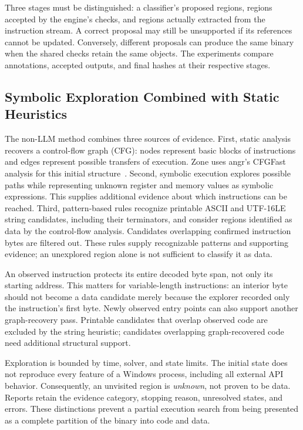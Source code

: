 Three stages must be distinguished: a classifier's proposed regions,
regions accepted by the engine's checks, and regions actually extracted
from the instruction stream. A correct proposal may still be unsupported
if its references cannot be updated. Conversely, different proposals can
produce the same binary when the shared checks retain the same objects.
The experiments compare annotations, accepted outputs, and final hashes
at their respective stages.

\subsection{Symbolic Exploration Combined with Static Heuristics}
The non-LLM method combines three sources of evidence. First, static
analysis recovers a control-flow graph (CFG): nodes represent basic blocks
of instructions and edges represent possible transfers of execution.
Zone uses angr's CFGFast analysis for this initial structure~\cite{angr_cfg_docs}.
Second, symbolic execution explores possible paths while representing
unknown register and memory values as symbolic expressions. This supplies
additional evidence about which instructions can be reached. Third,
pattern-based rules recognize printable ASCII and UTF-16LE string
candidates, including their terminators, and consider regions identified
as data by the control-flow analysis. Candidates overlapping confirmed
instruction bytes are filtered out. These rules supply recognizable
patterns and supporting evidence; an unexplored region alone is not
sufficient to classify it as data.

An observed instruction protects its entire decoded byte span, not only
its starting address. This matters for variable-length instructions: an
interior byte should not become a data candidate merely because the
explorer recorded only the instruction's first byte. Newly observed entry
points can also support another graph-recovery pass. Printable candidates
that overlap observed code are excluded by the string heuristic; candidates
overlapping graph-recovered code need additional structural support.

Exploration is bounded by time, solver, and state limits. The initial state
does not reproduce every feature of a Windows process, including all
external API behavior. Consequently, an unvisited region is \emph{unknown},
not proven to be data. Reports retain the evidence category, stopping
reason, unresolved states, and errors. These distinctions prevent a
partial execution search from being presented as a complete partition of
the binary into code and data.

